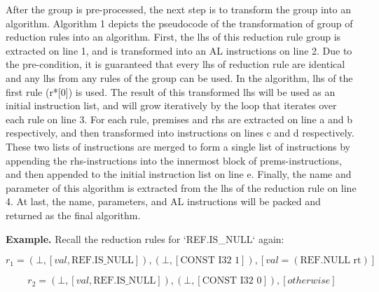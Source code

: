 After the group is pre-processed, the next step is to transform the group into
an algorithm. Algorithm 1 depicts the pseudocode of the transformation of group
of reduction rules into an algorithm.  First, the lhs of this reduction rule
group is extracted on line 1, and is transformed into an AL instructions on
line 2. Due to the pre-condition, it is guaranteed that every lhs of reduction
rule are identical and any lhs from any rules of the group can be used. In the
algorithm, lhs of the first rule (r*[0]) is used. The result of this
transformed lhs will be used as an initial instruction list, and will grow
iteratively by the loop that iterates over each rule on line 3.  For each rule,
premises and rhs are extracted on line a and b respectively, and then
transformed into instructions on lines c and d respectively. These two lists of
instructions are merged to form a single list of instructions by appending the
rhs-instructions into the innermost block of prems-instructions,
and then appended to the initial instruction list on line e.  Finally, the name and
parameter of this algorithm is extracted from the lhs of the reduction rule on
line 4. At last, the name, parameters, and AL instructions will be packed and
returned as the final algorithm.

\textbf{Example.} Recall the reduction rules for `REF.IS\_NULL` again:

\[r_1=(\bot, [val, \text{REF.IS\_NULL}]), (\bot, [\text{CONST I32 1}]), [val = (\text{REF.NULL rt})]\]

\[r_2=(\bot, [val, \text{REF.IS\_NULL}]), (\bot, [\text{CONST I32 0}]), [otherwise]\]

